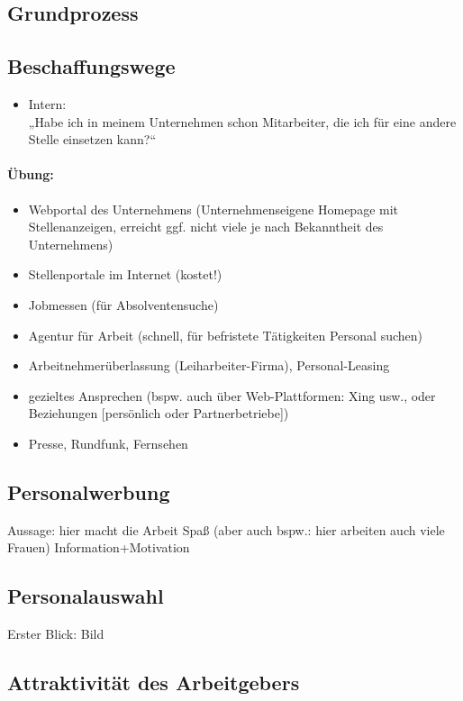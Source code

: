 \documentclass{scrreprt}
\begin{document}
\subsection{Grundprozess}
\subsection{Beschaffungswege}
\begin{itemize}
\item Intern:\\
„Habe ich in meinem Unternehmen schon Mitarbeiter, die ich für eine andere Stelle einsetzen kann?“
\end{itemize}

\paragraph{Übung:}
\begin{itemize}
\item Webportal des Unternehmens (Unternehmenseigene Homepage mit Stellenanzeigen, erreicht ggf. nicht viele je nach Bekanntheit des Unternehmens)
\item Stellenportale im Internet (kostet!)
\item Jobmessen (für Absolventensuche)
\item Agentur für Arbeit (schnell, für befristete Tätigkeiten Personal suchen)
\item Arbeitnehmerüberlassung (Leiharbeiter-Firma), Personal-Leasing
\item gezieltes Ansprechen (bspw. auch über Web-Plattformen: Xing usw., oder Beziehungen [persönlich oder Partnerbetriebe])
\item Presse, Rundfunk, Fernsehen
\end{itemize}
\subsection{Personalwerbung}
Aussage: hier macht die Arbeit Spaß (aber auch bspw.: hier arbeiten auch viele Frauen)
Information+Motivation
\subsection{Personalauswahl}
Erster Blick: Bild
\subsection{Attraktivität des Arbeitgebers}
\end{document}
